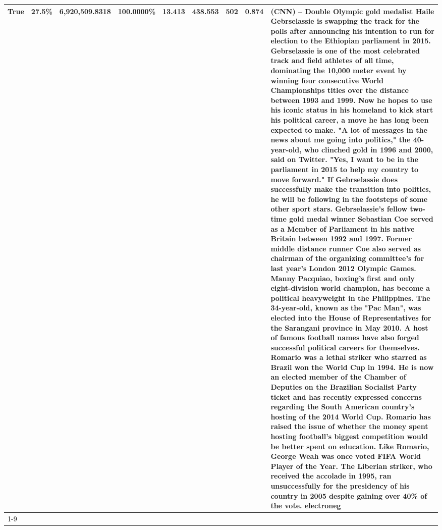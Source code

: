 \begin{table}[H]
{\begin{tabular}{lllrlllll}
True & 27.5\% & 6,920,509.8318 & \bfseries \color{red} 100.0000\% & 13.413 & 438.553 & 502 & 0.874 & (CNN) -- Double Olympic gold medalist Haile Gebrselassie is swapping the track for the polls after announcing his intention to run for election to the Ethiopian parliament in 2015. Gebrselassie is one of the most celebrated track and field athletes of all time, dominating the 10,000 meter event by winning four consecutive World Championships titles over the distance between 1993 and 1999. Now he hopes to use his iconic status in his homeland to kick start his political career, a move he has long been expected to make. "A lot of messages in the news about me going into politics," the 40-year-old, who clinched gold in 1996 and 2000, said on Twitter. "Yes, I want to be in the parliament in 2015 to help my country to move forward." If Gebrselassie does successfully make the transition into politics, he will be following in the footsteps of some other sport stars. Gebrselassie's fellow two-time gold medal winner Sebastian Coe served as a Member of Parliament in his native Britain between 1992 and 1997. Former middle distance runner Coe also served as chairman of the organizing committee's for last year's London 2012 Olympic Games. Manny Pacquiao, boxing's first and only eight-division world champion, has become a political heavyweight in the Philippines. The 34-year-old, known as the "Pac Man", was elected into the House of Representatives for the Sarangani province in May 2010. A host of famous football names have also forged successful political careers for themselves. Romario was a lethal striker who starred as Brazil won the World Cup in 1994. He is now an elected member of the Chamber of Deputies on the Brazilian Socialist Party ticket and has recently expressed concerns regarding the South American country's hosting of the 2014 World Cup. Romario has raised the issue of whether the money spent hosting football's biggest competition would be better spent on education. Like Romario, George Weah was once voted FIFA World Player of the Year. The Liberian striker, who received the accolade in 1995, ran unsuccessfully for the presidency of his country in 2005 despite gaining over 40\% of the vote. electroneg \\
\cline{1-9}

\end{tabular}}
\end{table}
